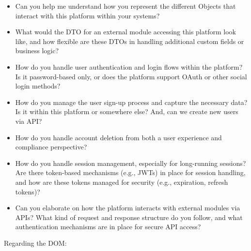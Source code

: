 \documentclass[
]{article}
\providecommand{\tightlist}{%
  \setlength{\itemsep}{0pt}\setlength{\parskip}{0pt}}
\begin{document}
\begin{itemize}
  \begin{itemize}
  \tightlist
  \item
    Can you help me understand how you represent the different Objects
    that interact with this platform within your systems?
  \item
    What would the DTO for an external module accessing this platform
    look like, and how flexible are these DTOs in handling additional
    custom fields or business logic?
  \item
    How do you handle user authentication and login flows within the
    platform? Is it password-based only, or does the platform support
    OAuth or other social login methods?
  \item
    How do you manage the user sign-up process and capture the necessary
    data? Is it within this platform or somewhere else? And, can we
    create new users via API?
  \item
    How do you handle account deletion from both a user experience and
    compliance perspective?
  \item
    How do you handle session management, especially for long-running
    sessions? Are there token-based mechanisms (e.g., JWTs) in place for
    session handling, and how are these tokens managed for security
    (e.g., expiration, refresh tokens)?
  \item
    Can you elaborate on how the platform interacts with external
    modules via APIs? What kind of request and response structure do you
    follow, and what authentication mechanisms are in place for secure
    API access?
  \end{itemize}
\end{itemize}

Regarding the DOM:
\end{document}
